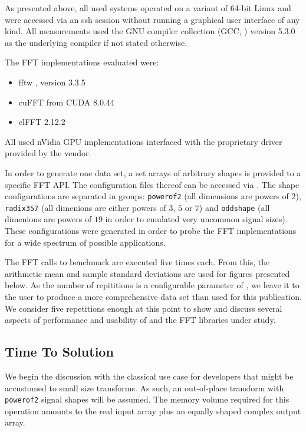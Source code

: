 As presented above, all used systems operated on a variant of 64-bit Linux and were accessed via an ssh session without running a graphical user interface of any kind. All measurements used the GNU compiler collection (GCC, \cite{stallman2001using}) version 5.3.0 as the underlying compiler if not stated otherwise. 

The FFT implementations evaluated were:

\begin{itemize}
\item fftw \cite{FFTW05}, version 3.3.5
\item cuFFT from CUDA 8.0.44
\item clFFT 2.12.2
\end{itemize}

All used nVidia GPU implementations interfaced with the proprietary driver provided by the vendor. 

In order to generate one data set, a set arrays of arbitrary shapes is provided to a specific FFT API. The configuration files thereof can be accessed via \cite{gearshifft_github}. The shape configurations are separated in groups: \texttt{powerof2} (all dimensions are powers of $2$), \texttt{radix357} (all dimenions are either powers of $3$, $5$ or $7$) and \texttt{oddshape} (all dimenions are powers of $19$ in order to emulated very uncommon signal sizes). These configurations were generated in order to probe the FFT implementations for a wide spectrum of possible applications.  

The FFT calls to benchmark are executed five times each. From this, the arithmetic mean and sample standard deviations are used for figures presented below. As the number of repititions is a configurable parameter of \gearshifft{}, we leave it to the user to produce a more comprehensive data set than used for this publication. We consider five repetitions enough at this point to show and discuss several aspects of performance and usability of \gearshifft{} and the FFT libraries under study.  


\subsection{Time To Solution}
\label{ssec:tts}

We begin the discussion with the classical use case for developers that might be accustomed to small size transforms. As such, an out-of-place transform with \texttt{powerof2} signal shapes will be assumed. The memory volume required for this operation amounts to the real input array plus an equally shaped complex output array.   

